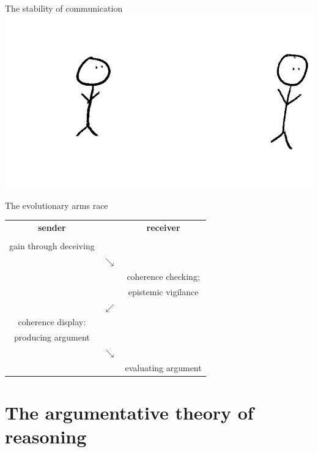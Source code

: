 \documentclass[xcolor=table]{beamer}       %
\begin{document}
\begin{frame}{The stability of communication}
    \includegraphics[width=\textwidth]{img/stability-communication-4.png}
\end{frame}

\begin{frame}{The evolutionary arms race}
    \centering
    \begin{tabular}{ccc}
        \textbf{sender} & & \textbf{receiver} \\ \\
        gain through deceiving \\
                        \pause & $\searrow$ & \\
                        & & coherence checking; \\ & & epistemic vigilance \\
                        \pause & $\swarrow$ \\
                        coherence display: \\ producing argument \\
                        \pause & $\searrow$ & \\
                        & & evaluating argument
    \end{tabular}
\end{frame}

\section{The argumentative theory of reasoning}
\end{document}
